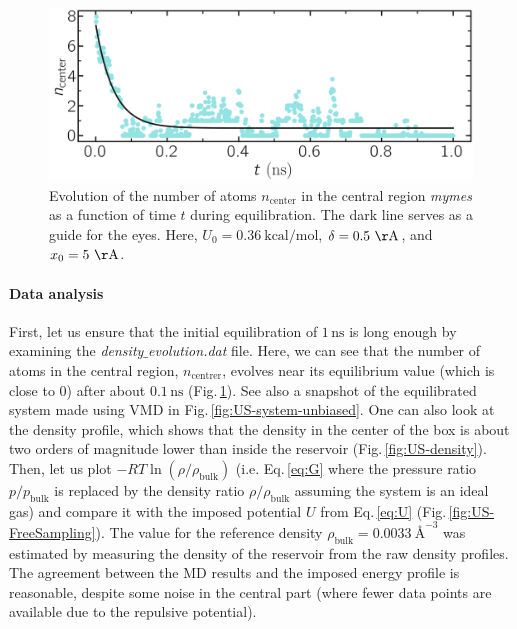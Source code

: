 \documentclass[9pt,tutorial]{livecoms}
\begin{document}
\begin{figure}
\centering
\includegraphics[width=\linewidth]{US-density-evolution}
\caption{Evolution of the number of atoms $n_\text{center}$ in the central region \textit{mymes} as a function of time $t$ during equilibration. The dark line serves as a guide for the eyes. Here, $U_0 = 0.36~\text{kcal/mol}$, $\delta = 0.5~\mathrm{\AA{}}$, and $x_0 = 5~\mathrm{\AA{}}$.}
\label{fig:US-density-evolution}
\end{figure}

\paragraph{Data analysis}
First, let us ensure that the initial equilibration of $1\,\text{ns}$ is long enough by examining the \textit{density$\_$evolution.dat} file. Here, we can see that the number of atoms in the central region, $n_\mathrm{centrer}$, evolves near its equilibrium value (which is close to 0) after about $0.1\,\text{ns}$ (Fig.\,\ref{fig:US-density-evolution}). See also a snapshot of the equilibrated system made using VMD in Fig.\,\ref{fig:US-system-unbiased}. One can also look at the density profile, which shows that the density in the center of the box is about two orders of magnitude lower than inside the reservoir (Fig.\,\ref{fig:US-density}). Then, let us plot $-R T \ln(\rho/\rho_\mathrm{bulk})$ (i.e. Eq.\,\eqref{eq:G} where the pressure ratio $p/p_\mathrm{bulk}$ is replaced by the density ratio $\rho/\rho_\mathrm{bulk}$ assuming the system is an ideal gas) and compare it with the imposed potential $U$ from Eq.\,\eqref{eq:U} (Fig.\,\ref{fig:US-FreeSampling}). The value for the reference density $\rho_\text{bulk} = 0.0033~\text{\AA{}}^{-3}$ was estimated by measuring the density of the reservoir from the raw density profiles. The agreement between the MD results and the imposed energy profile is reasonable, despite some noise in the central part (where fewer data points are available due to the repulsive potential).
\end{document}
